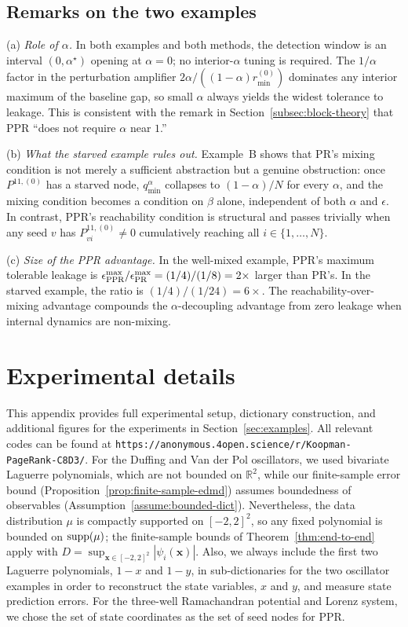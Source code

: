 \documentclass{article}
\theoremstyle{plain}
\theoremstyle{definition}
\def\R{\mathbb{R}}
\def\x{\mathbf{x}}
\newcommand{\anonrepo}{https://anonymous.4open.science/r/Koopman-PageRank-C8D3/}
\newcommand{\arXivtag}[1][]{#1}
\begin{document}
\subsection{Remarks on the two examples}\label{app:2state-discuss}

(a) \emph{Role of $\alpha$.} In both examples and both methods, the detection window is an interval $(0,\alpha^\star)$ opening at $\alpha = 0$; no interior-$\alpha$ tuning is required. The $1/\alpha$ factor in the perturbation amplifier $2\alpha/((1-\alpha)r^{(0)}_{\min})$ dominates any interior maximum of the baseline gap, so small $\alpha$ always yields the widest tolerance to leakage. This is consistent with the remark in Section~\ref{subsec:block-theory} that PPR ``does not require $\alpha$ near $1$\arXivtag[.]''

(b) \emph{What the starved example rules out.} Example~B shows that PR's mixing condition is not merely a sufficient abstraction but a genuine obstruction: once $P^{11,(0)}$ has a starved node, $q_{\min}^\alpha$ collapses to $(1-\alpha)/N$ for every $\alpha$, and the mixing condition becomes a condition on $\beta$ alone, independent of both $\alpha$ and $\epsilon$. In contrast, PPR's reachability condition is structural and passes trivially when any seed $v$ has $P^{11,(0)}_{vi} \neq 0$ cumulatively reaching all \arXivtag[$i \in \{1,\ldots, N\}$].

(c) \emph{Size of the PPR advantage.} In the well-mixed example, PPR's maximum tolerable leakage is $\epsilon^{\max}_{\textnormal{PPR}}/\epsilon^{\max}_{\textnormal{PR}} = (1/4)/(1/8) = 2\times$ larger than PR's. In the starved example, the ratio is $(1/4)/(1/24) = 6\times$. The reachability-over-mixing advantage compounds the $\alpha$-decoupling advantage from zero leakage when internal dynamics are non-mixing.

\section{Experimental details}\label{app:experiments}

This appendix provides full experimental setup, dictionary construction, and additional figures for the experiments in Section~\ref{sec:examples}. All relevant codes can be found at \texttt{\anonrepo}. For the Duffing and Van der Pol oscillators, we used bivariate Laguerre polynomials, which are not bounded on $\R^2$, while our finite-sample error bound (Proposition~\ref{prop:finite-sample-edmd}) assumes boundedness of observables (Assumption~\ref{assume:bounded-dict}). Nevertheless, the data distribution $\mu$ is compactly supported on $[-2,2]^2$, so any fixed polynomial is bounded on $\textnormal{supp}(\mu)$; the finite-sample bounds of Theorem~\ref{thm:end-to-end} apply with $D = \sup_{\x \in [-2,2]^2} |\psi_i(\x)|$. Also, we always include the first two Laguerre polynomials, $1-x$ and $1-y$, in sub-dictionaries for the two oscillator examples in order to reconstruct the state variables, $x$ and $y$, and measure state prediction errors. 
%
For the three-well Ramachandran potential and Lorenz system, we chose the set of state coordinates as the set of seed nodes for PPR. 
\end{document}
